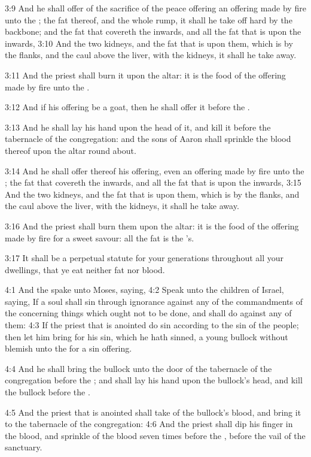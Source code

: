 3:9 And he shall offer of the sacrifice of the peace offering an offering made by fire unto the \LORD; the fat thereof, and the whole rump, it shall he take off hard by the backbone; and the fat that covereth the inwards, and all the fat that is upon the inwards, 3:10 And the two kidneys, and the fat that is upon them, which is by the flanks, and the caul above the liver, with the kidneys, it shall he take away.

3:11 And the priest shall burn it upon the altar: it is the food of the offering made by fire unto the \LORD.

3:12 And if his offering be a goat, then he shall offer it before the \LORD.

3:13 And he shall lay his hand upon the head of it, and kill it before the tabernacle of the congregation: and the sons of Aaron shall sprinkle the blood thereof upon the altar round about.

3:14 And he shall offer thereof his offering, even an offering made by fire unto the \LORD; the fat that covereth the inwards, and all the fat that is upon the inwards, 3:15 And the two kidneys, and the fat that is upon them, which is by the flanks, and the caul above the liver, with the kidneys, it shall he take away.

3:16 And the priest shall burn them upon the altar: it is the food of the offering made by fire for a sweet savour: all the fat is the \LORD's.

3:17 It shall be a perpetual statute for your generations throughout all your dwellings, that ye eat neither fat nor blood.

4:1 And the \LORD spake unto Moses, saying, 4:2 Speak unto the children of Israel, saying, If a soul shall sin through ignorance against any of the commandments of the \LORD concerning things which ought not to be done, and shall do against any of them: 4:3 If the priest that is anointed do sin according to the sin of the people; then let him bring for his sin, which he hath sinned, a young bullock without blemish unto the \LORD for a sin offering.

4:4 And he shall bring the bullock unto the door of the tabernacle of the congregation before the \LORD; and shall lay his hand upon the bullock's head, and kill the bullock before the \LORD.

4:5 And the priest that is anointed shall take of the bullock's blood, and bring it to the tabernacle of the congregation: 4:6 And the priest shall dip his finger in the blood, and sprinkle of the blood seven times before the \LORD, before the vail of the sanctuary.

